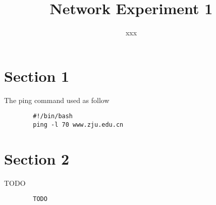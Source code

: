 \documentclass[UTF8]{article}
\title{Network Experiment 1}
\author{xxx}
\begin{document}
\maketitle

\section{Section 1}
The ping command used as follow
\begin{center}
    \begin{verbatim}
        #!/bin/bash
        ping -l 70 www.zju.edu.cn
    \end{verbatim}
\end{center}

\section{Section 2}
TODO
\begin{center}
    \begin{verbatim}
        TODO
    \end{verbatim}
\end{center}
\end{document}
